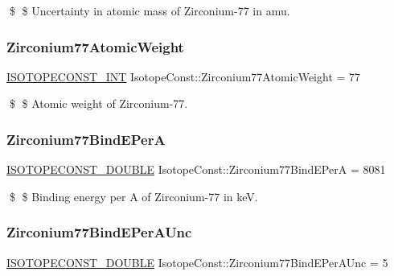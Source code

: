 \$ \$ Uncertainty in atomic mass of Zirconium-\/77 in amu. \mbox{\label{group___isotope_const-_zirconium-_zr77_ga8917390415dd32fa2ef144ec539dbe34}} 
\subsubsection{\texorpdfstring{Zirconium77\+Atomic\+Weight}{Zirconium77AtomicWeight}}
{\footnotesize\ttfamily \mbox{\hyperlink{group___isotope_const-_macros_ga5f18360b3e99483a35c32d789e62621c}{I\+S\+O\+T\+O\+P\+E\+C\+O\+N\+S\+T\+\_\+\+I\+NT}} Isotope\+Const\+::\+Zirconium77\+Atomic\+Weight = 77}

\$ \$ Atomic weight of Zirconium-\/77. \mbox{\label{group___isotope_const-_zirconium-_zr77_ga61bbc798fa10ad681da826656b13df65}} 
\subsubsection{\texorpdfstring{Zirconium77\+Bind\+E\+PerA}{Zirconium77BindEPerA}}
{\footnotesize\ttfamily \mbox{\hyperlink{group___isotope_const-_macros_ga8f45a7272ce02c0b4c65c44636ed719a}{I\+S\+O\+T\+O\+P\+E\+C\+O\+N\+S\+T\+\_\+\+D\+O\+U\+B\+LE}} Isotope\+Const\+::\+Zirconium77\+Bind\+E\+PerA = 8081}

\$ \$ Binding energy per A of Zirconium-\/77 in keV. \mbox{\label{group___isotope_const-_zirconium-_zr77_ga5fa6666723257774d4bdc10e3b9cefcb}} 
\subsubsection{\texorpdfstring{Zirconium77\+Bind\+E\+Per\+A\+Unc}{Zirconium77BindEPerAUnc}}
{\footnotesize\ttfamily \mbox{\hyperlink{group___isotope_const-_macros_ga8f45a7272ce02c0b4c65c44636ed719a}{I\+S\+O\+T\+O\+P\+E\+C\+O\+N\+S\+T\+\_\+\+D\+O\+U\+B\+LE}} Isotope\+Const\+::\+Zirconium77\+Bind\+E\+Per\+A\+Unc = 5}

